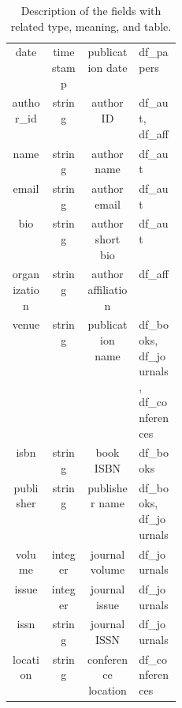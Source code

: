 \begin{table}[H]
\begin{center}
\begin{tabular}{| c | c | c | p{0.25\linewidth} |}
            date                & timestamp       & publication date      & df\_papers\T\B                                           \\
            author\_id          & string          & author ID             & df\_aut, df\_aff\T\B                                     \\
            name                & string          & author name           & df\_aut\T\B                                              \\
            email               & string          & author email          & df\_aut\T\B                                              \\
            bio                 & string          & author short bio      & df\_aut\T\B                                              \\
            organization        & string          & author affiliation    & df\_aff\T\B                                              \\
            venue               & string          & publication name      & df\_books, df\_journals, df\_conferences\T\B             \\
            isbn                & string          & book ISBN             & df\_books\T\B                                            \\
            publisher           & string          & publisher name        & df\_books, df\_journals\T\B                              \\
            volume              & integer         & journal volume        & df\_journals\T\B                                         \\
            issue               & integer         & journal issue         & df\_journals\T\B                                         \\
            issn                & string          & journal ISSN          & df\_journals\T\B                                         \\
            location            & string          & conference location   & df\_conferences\T\B                                      \\
            \hline
        \end{tabular}
        \\[8pt]
        \caption{Description of the fields with related type, meaning, and table.}
        \label{tab:dataset_structure}%
    \end{center}
\end{table}
